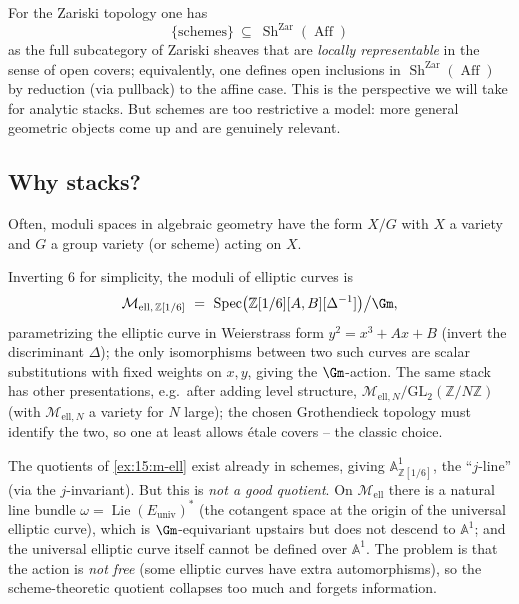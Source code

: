 \begin{example}
\label{ex:15:schemes}
For the Zariski topology one has
\begin{equation*}
\{\text{schemes}\}\ \subseteq\ \operatorname{Sh}^{\mathrm{Zar}}(\operatorname{Aff})
\end{equation*}
as the full subcategory of Zariski sheaves that are \emph{locally representable} in
the sense of open covers; equivalently, one defines open inclusions in
$\operatorname{Sh}^{\mathrm{Zar}}(\operatorname{Aff})$ by reduction (via pullback) to
the affine case. This is the perspective we will take for analytic stacks. But
schemes are too restrictive a model: more general geometric objects come up and are
genuinely relevant.
\end{example}

\subsection{Why stacks?}
\label{subsec:15:why-stacks}

Often, moduli spaces in algebraic geometry have the form $X/G$ with $X$ a variety
and $G$ a group variety (or scheme) acting on $X$.

\begin{example}
\label{ex:15:m-ell}
Inverting $6$ for simplicity, the moduli of elliptic curves is
\begin{equation*}
\mathcal{M}_{\mathrm{ell},\,\mathbb{Z}[1/6]}\ =\ \operatorname{Spec}\bigl(\mathbb{Z}[1/6][A,B][\Delta^{-1}]\bigr)\big/\Gm ,
\end{equation*}
parametrizing the elliptic curve in Weierstrass form $y^2 = x^3 + Ax + B$ (invert
the discriminant $\Delta$); the only isomorphisms between two such curves are scalar
substitutions with fixed weights on $x,y$, giving the $\Gm$-action. The same stack
has other presentations, e.g.\ after adding level structure,
$\mathcal{M}_{\mathrm{ell},N}/\mathrm{GL}_2(\mathbb{Z}/N\mathbb{Z})$ (with
$\mathcal{M}_{\mathrm{ell},N}$ a variety for $N$ large); the chosen Grothendieck
topology must identify the two, so one at least allows \'etale covers -- the classic
choice.
\end{example}

\begin{remark}
\label{rmk:15:bad-quotient}
The quotients of \cref{ex:15:m-ell} exist already in schemes, giving
$\mathbb{A}^1_{\mathbb{Z}[1/6]}$, the ``$j$-line'' (via the $j$-invariant). But this
is \emph{not a good quotient}. On $\mathcal{M}_{\mathrm{ell}}$ there is a natural
line bundle $\omega = \operatorname{Lie}(E_{\mathrm{univ}})^{*}$ (the cotangent space
at the origin of the universal elliptic curve), which is $\Gm$-equivariant upstairs
but does not descend to $\mathbb{A}^1$; and the universal elliptic curve itself
cannot be defined over $\mathbb{A}^1$. The problem is that the action is \emph{not
free} (some elliptic curves have extra automorphisms), so the scheme-theoretic
quotient collapses too much and forgets information.
\end{remark}

